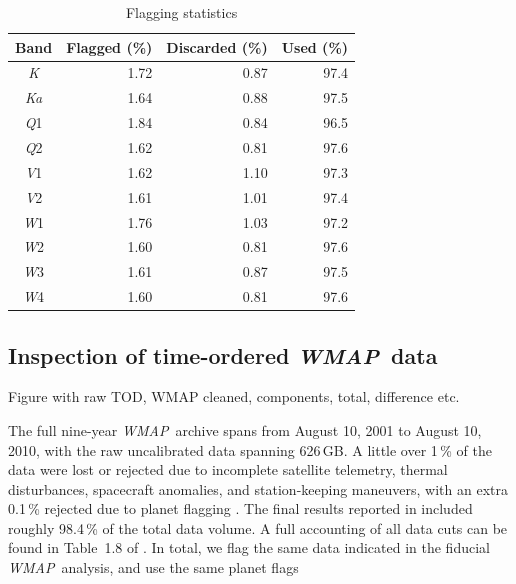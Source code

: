 \documentclass[twocolumn]{../../common/aa}
\def\WMAP{\emph{WMAP}}
\newcommand{\K}[0]{\textit K}
\newcommand{\Ka}[0]{\textit{Ka}}
\newcommand{\Q}[0]{\textit Q}
\newcommand{\V}[0]{\textit V}
\newcommand{\W}[0]{\textit W}
\begin{document}
\begin{table}
\caption{Flagging statistics}              %
\label{table:flagged_data}      %
\centering                                      %
\begin{tabular}{c r r r}          %
\hline\hline                        %
	Band & Flagged (\%) & Discarded (\%) & Used (\%) \\    %
\hline                                   %
	\K  &  1.72 & 0.87 & 97.4\\
	\Ka &  1.64 & 0.88 & 97.5\\      %
	\Q1 &  1.84 & 0.84 & 96.5\\
	\Q2 &  1.62 & 0.81 & 97.6\\
	\V1 &  1.62 & 1.10 & 97.3\\
	\V2 &  1.61 & 1.01 & 97.4\\
	\W1 &  1.76 & 1.03 & 97.2\\
	\W2 &  1.60 & 0.81 & 97.6\\
	\W3 &  1.61 & 0.87 & 97.5\\
	\W4 &  1.60 & 0.81 & 97.6\\
\hline                                             %
\end{tabular}
\end{table}

\subsection{Inspection of time-ordered \WMAP\ data}
\label{sec:tod}

Figure with raw TOD, WMAP cleaned, components, total, difference etc.




The full nine-year \WMAP\ archive spans from August 10, 2001 to August 10, 2010, with the raw uncalibrated data spanning 626\,GB. A little over 1\,\% of the data were lost or rejected due to incomplete satellite telemetry, thermal disturbances, spacecraft anomalies, and station-keeping maneuvers, with an extra 0.1\,\% rejected due to planet flagging \citep{bennett2003a,hinshaw2007,hinshaw2009,bennett2012}. 
The final results reported in \citet{bennett2012} included roughly 98.4\,\% of the total data volume.
A full accounting of all data cuts can be found in Table~1.8 of \citet{wmapexsupp}. In total, we flag the same data indicated in the fiducial \WMAP\ analysis, and use the same planet flags
\end{document}
